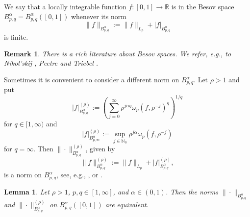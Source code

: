 \documentclass[12pt]{article}
\newtheorem{lemma}{Lemma}
\newtheorem{remark}{Remark}
\newcommand{\real}{\mathbb{R}}
\begin{document}
We say that a locally integrable 
 function $f:[0,1]\rightarrow \real$ is in the Besov space 
 $B^\alpha_{p,q} = B^\alpha_{p,q} ([0,1])$
whenever its norm
\begin{equation*}
\|f\|_{B^\alpha_{p,q}} :=   \|f\|_{L_p}  +
|f|_{B^\alpha_{p,q}}
\end{equation*}
is finite.


\begin{remark}
 \rm
There is a rich literature about Besov spaces. We refer, e.g.,  to Nikol'skij \cite{Ni}, Peetre \cite{Pee76}
and Triebel \cite{Tri83, Tri92, Tri06}.
\end{remark}

Sometimes it is convenient to consider a different norm
on $B^\alpha_{p,q}$. Let  $\rho>1$ and put
\begin{equation*}
|f|^{(\rho)}_{B^\alpha_{p,q}} := \left( \sum^\infty_{j=0}
\rho^{j\alpha q}
\omega_p(f, \rho^{-j})^q \right)^{1/q}
\end{equation*}
for $q\in [1,\infty)$ and
\begin{equation*}
|f|^{(\rho)}_{B^\alpha_{p,\infty}} :=
\sup_{j \in \mathbb{N}_0} \rho^{j\alpha} \omega_p(f,\rho^{-j})
\end{equation*}
for $q=\infty$. Then
$\|\cdot\|^{(\rho)}_{B^\alpha_{p,q}}$, given by
\begin{equation*}
\|f\|^{(\rho)}_{B^\alpha_{p,q}} := \|f\|_{L_p}
+ |f|^{(\rho)}_{B^\alpha_{p,q}},
\end{equation*}
is a norm on $B^\alpha_{p,q}$, see, e.g., \cite[2.2.1]{Tri78},
\cite[(2.7)]{DP88} or \cite[(4.6)]{Dah96}.

\begin{lemma}
\label{Normeq}
Let $\rho>1$, $p,q\in [1,\infty]$, and $\alpha \in (0,1)$. Then the norms $\|\cdot\|_{B^\alpha_{p,q}}$ and
$\|\cdot\|^{(\rho)}_{B^\alpha_{p,q}}$ on $B^\alpha_{p,q} ([0,1])$
are equivalent.
\end{lemma}
\end{document}
